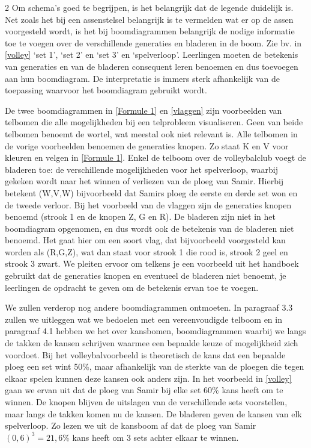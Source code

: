 \begin{multicols}{2}
Om schema’s goed te begrijpen, is het belangrijk dat de legende duidelijk is. Net zoals het bij een assenstelsel belangrijk is te vermelden wat er op de assen voorgesteld wordt, is het bij boomdiagrammen belangrijk de nodige informatie toe te voegen over de verschillende generaties en bladeren in de boom. Zie bv. in \autoref{volley} ‘set 1’, ‘set 2’ en ‘set 3’ en ‘spelverloop’. Leerlingen moeten de betekenis van generaties en van de bladeren consequent leren benoemen en dus toevoegen aan hun boomdiagram. De interpretatie is immers sterk afhankelijk van de toepassing waarvoor het boomdiagram gebruikt wordt.

De twee boomdiagrammen in \autoref{Formule 1} en \autoref{vlaggen} zijn voorbeelden van telbomen die alle mogelijkheden bij een telprobleem visualiseren. Geen van beide telbomen benoemt de wortel, wat meestal ook niet relevant is. Alle telbomen in de vorige voorbeelden benoemen de generaties knopen. Zo staat K en V voor kleuren en velgen in \autoref{Formule 1}. Enkel de telboom over de volleybalclub voegt de bladeren toe: de verschillende mogelijkheden voor het spelverloop, waarbij gekeken wordt naar het winnen of verliezen van de ploeg van Samir. Hierbij betekent (W,V,W) bijvoorbeeld dat Samirs ploeg de eerste en derde set won en de tweede verloor. Bij het voorbeeld van de vlaggen zijn de generaties knopen benoemd (strook 1 en de knopen Z, G en R). De bladeren zijn niet in het boomdiagram opgenomen, en dus wordt ook de betekenis van de bladeren niet benoemd. Het gaat hier om een soort vlag, dat bijvoorbeeld voorgesteld kan worden als (R,G,Z), wat dan staat voor strook 1 die rood is, strook 2 geel en strook 3 zwart.  We pleiten ervoor om telkens je een voorbeeld uit het handboek gebruikt dat de generaties knopen en eventueel de bladeren niet benoemt, je leerlingen de opdracht te geven om de betekenis ervan toe te voegen. 

We zullen verderop nog andere boomdiagrammen ontmoeten. In paragraaf 3.3 zullen we uitleggen wat we bedoelen met een vereenvoudigde telboom en in paragraaf 4.1 hebben we het over kansbomen, boomdiagrammen waarbij we langs de takken de kansen schrijven waarmee een bepaalde keuze of mogelijkheid zich voordoet. Bij het volleybalvoorbeeld is theoretisch de kans dat een bepaalde ploeg een set wint 50\%, maar afhankelijk van de sterkte van de ploegen die tegen elkaar spelen kunnen deze kansen ook anders zijn. In het voorbeeld in \autoref{volley} gaan we ervan uit dat de ploeg van Samir bij elke set 60\% kans heeft om te winnen. De knopen blijven de uitslagen van de verschillende sets voorstellen, maar langs de takken komen nu de kansen. De bladeren geven de kansen van elk spelverloop. Zo lezen we uit de kansboom af dat de ploeg van Samir \((0,6)^3=21,6\%\) kans heeft om 3 sets achter elkaar te winnen.


\end{multicols}

